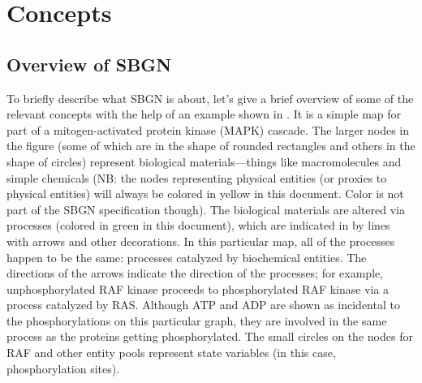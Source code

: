\chapter{Concepts}
\label{chp:concepts}

\section{Overview of SBGN \PDs}
\label{sec:PD-overview}

To briefly describe what SBGN \PDl is about, let's give a brief overview of some of the relevant concepts with the help of an example shown in . It is a simple map for part of a mitogen-activated protein kinase (MAPK) cascade.  The larger nodes in the figure (some of which are in the shape of rounded rectangles and others in the shape of circles) represent biological materials---things like macromolecules and simple chemicals (NB: the nodes representing physical entities (or proxies to physical entities) will always be colored in yellow in this document. Color is not part of the SBGN specification though).
The biological materials are altered via processes (colored in green in this document), which are indicated in \PDl by lines with arrows and other decorations.  In this particular map, all of the processes happen to be the same: processes catalyzed by biochemical entities.
The directions of the arrows indicate the direction of the processes; for example, unphosphorylated RAF kinase proceeds to phosphorylated RAF kinase via a process catalyzed by RAS. Although ATP and ADP are shown as incidental to the phosphorylations on this particular graph, they are involved in the same process as the proteins getting
phosphorylated. The small circles on the nodes for RAF and other entity pools represent state variables (in this case, phosphorylation sites).

